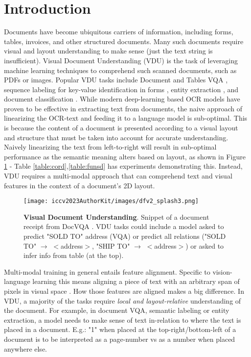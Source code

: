 \documentclass[10pt,twocolumn,letterpaper]{article}
\begin{document}
\section{Introduction}
\label{sec:intro}



Documents have become ubiquitous carriers of information, including forms, tables, invoices, and other structured documents. Many such documents require visual and layout understanding to make sense (just the text string is insufficient). Visual Document Understanding (VDU) is the task of leveraging machine learning techniques to comprehend such scanned documents, such as PDFs or images. Popular VDU tasks include Document and Tables VQA \cite{mathew2020docvqa,Chen2019TabFactAL}, sequence labeling for key-value identification in forms \cite{Jaume2019FUNSDAD}, entity extraction \cite{park2019cord}, and document classification \cite{harley2015icdar}. While modern deep-learning based OCR models \cite{litman2020scatter} have proven to be effective in extracting text from documents, the naive approach of linearizing the OCR-text and feeding it to a language model is sub-optimal. This is because the content of a document is presented according to a visual layout and structure that must be taken into account for accurate understanding. Naively linearizing the text from left-to-right will result in sub-optimal performance as the semantic meaning alters based on layout, as shown in Figure \ref{fig:splash} - Table \ref{table:cord},\ref{table:funsd} has experiments demonstrating this. Instead, VDU requires a multi-modal approach that can comprehend text and visual features in the context of a document's 2D layout.

\begin{figure}
  \centering
  \texttt{[image: iccv2023AuthorKit/images/dfv2\_splash3.png]}
  \caption{\textbf{Visual Document Understanding}. Snippet of a document receipt from DocVQA \cite{mathew2021docvqa}. VDU tasks could include a model asked to predict "SOLD TO" address (VQA) or predict all relations ("SOLD TO" $\rightarrow$ $<$address$>$, "SHIP TO" $\rightarrow$ $<$address$>$) or asked to infer info from table (at the top).
  }
  \label{fig:splash}
  \vspace{-5mm}
\end{figure}



Multi-modal training in general entails feature alignment. Specific to vision-language learning this means aligning a piece of text with an arbitrary span of pixels in visual space \cite{hoyoro,Kim2021ViLTVT,CLIPRadford2021LearningTV,wang2022git,Alayrac2022FlamingoAV,biten2022latr,appalaraju2021docformer,Hao2022MixGenAN,appalaraju2020towards,Li2022SeeTek,Chen2022PaLI}. How those features are aligned makes a big difference. In VDU, a majority of the tasks require \textit{local and layout-relative} understanding of the document. For example, in document VQA, semantic labeling or entity extraction, a model needs to make sense of text in-relation to where the text is placed in a document. E.g.: "1" when placed at the top-right/bottom-left of a document is to be interpreted as a page-number vs as a number when placed anywhere else. 
\end{document}
